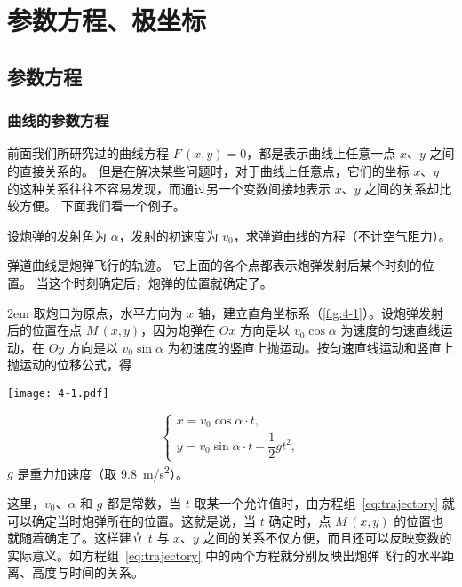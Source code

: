 \chapter{参数方程、极坐标}
\section{参数方程}
\subsection{曲线的参数方程}
前面我们所研究过的曲线方程 $F\,(x,y) = 0$，都是表示曲线上任意一点 $x$、$y$ 之间的直接关系的。
但是在解决某些问题时，对于曲线上任意点，它们的坐标 $x$、$y$ 的这种关系往往不容易发现，而通过另一个变数间接地表示 $x$、$y$ 之间的关系却比较方便。
下面我们看一个例子。

设炮弹的发射角为 $\alpha$，发射的初速度为 $v_0$，求弹道曲线的方程（不计空气阻力）。

弹道曲线是炮弹飞行的轨迹。
它上面的各个点都表示炮弹发射后某个时刻的位置。
当这个时刻确定后，炮弹的位置就确定了。

\medskip\noindent
\begin{minipage}{0.55\linewidth}\parindent2em
取炮口为原点，水平方向为 $x$ 轴，建立直角坐标系（\cref{fig:4-1}）。设炮弹发射后的位置在点 $M\,(x,y)$，因为炮弹在 $Ox$ 方向是以 $v_0\cos\alpha$ 为速度的匀速直线运动，在 $Oy$ 方向是以 $v_0\sin\alpha$ 为初速度的竖直上抛运动。按匀速直线运动和竖直上抛运动的位移公式，得
\end{minipage}\hfill
\begin{minipage}{0.4\linewidth}\centering
  \begin{figurehere}
    \texttt{[image: 4-1.pdf]}
    \caption{}\label{fig:4-1}
  \end{figurehere}
\end{minipage}
\begin{equation}
  \label{eq:trajectory}
  \begin{cases}
    x=v_0\cos\alpha\cdot t,\\
    y=v_0\sin\alpha\cdot t-\dfrac{1}{2}gt^2,
  \end{cases}
\end{equation}
$g$ 是重力加速度（取 \qty{9.8}{m/s^2}）。



这里，$v_0$、$\alpha$ 和 $g$ 都是常数，当 $t$ 取某一个允许值时，由方程组~\eqref{eq:trajectory} 就可以确定当时炮弹所在的位置。这就是说，当 $t$ 确定时，点 $M\,(x,y)$ 的位置也就随着确定了。这样建立 $t$ 与 $x$、$y$ 之间的关系不仅方便，而且还可以反映变数的实际意义。如方程组~\eqref{eq:trajectory} 中的两个方程就分别反映出炮弹飞行的水平距离、高度与时间的关系。

